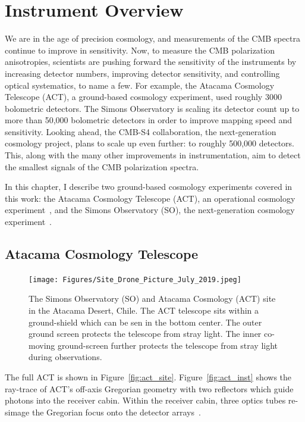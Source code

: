 \chapter{Instrument Overview}
\label{ch:instruments}

We are in the age of precision cosmology, and measurements of the CMB spectra continue to improve in sensitivity.  Now, to measure the CMB polarization anisotropies, scientists are pushing forward the sensitivity of the instruments by increasing detector numbers, improving detector sensitivity, and controlling optical systematics, to name a few.  For example, the Atacama Cosmology Telescope (ACT), a ground-based cosmology experiment, used roughly 3000 bolometric detectors.  The Simons Observatory is scaling its detector count up to more than 50,000 bolometric detectors in order to improve mapping speed and sensitivity.  Looking ahead, the CMB-S4 collaboration, the next-generation cosmology project, plans to scale up even further: to roughly 500,000 detectors.  This, along with the many other improvements in instrumentation, aim to detect the smallest signals of the CMB polarization spectra.

In this chapter, I describe two ground-based cosmology experiments covered in this work: the Atacama Cosmology Telescope (ACT), an operational cosmology experiment~\cite{act_inst}, and the Simons Observatory (SO), the next-generation cosmology experiment~\cite{so19}. 

\section{Atacama Cosmology Telescope}
\begin{figure}[ht]
    \centering
    \texttt{[image: Figures/Site\_Drone\_Picture\_July\_2019.jpeg]}
    \caption{The Simons Observatory (SO) and Atacama Cosmology (ACT) site in the Atacama Desert, Chile. The ACT telescope sits within a ground-shield which can be sen in the bottom center.  The outer ground screen protects the telescope from stray light.  The inner co-moving ground-screen further protects the telescope from stray light during observations.}
    \label{fig:act_so_site}
\end{figure}

The full ACT is shown in Figure~\ref{fig:act_site}.  Figure~\ref{fig:act_inst} shows the ray-trace of ACT's off-axis Gregorian geometry with two reflectors which guide photons into the receiver cabin.  Within the receiver cabin, three optics tubes re-simage the Gregorian focus onto the detector arrays~\cite{thornton_2016}.

